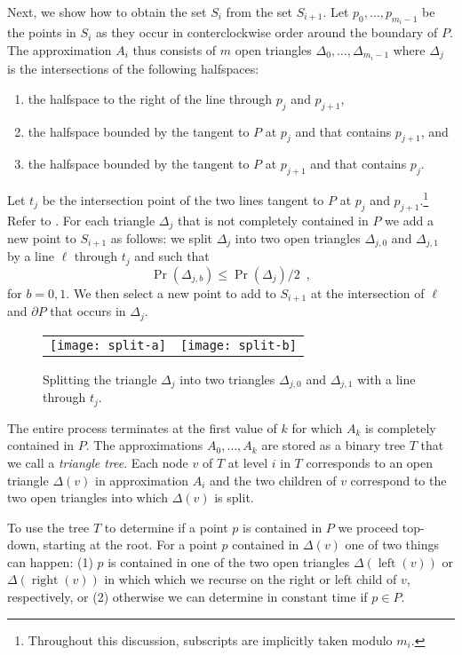 \documentclass[charterfonts,lotsofwhite]{patmorin}
\newcommand{\boundary}{\partial}
\DeclareMathOperator{\lft}{left}
\DeclareMathOperator{\rght}{right}
\begin{document}
Next, we show how to obtain the set $S_i$ from the set $S_{i+1}$.  Let
$p_0,\ldots,p_{m_i-1}$ be the points in $S_i$ as they occur in
conterclockwise order around the boundary of $P$.  The approximation
$A_i$ thus consists of $m$ open triangles
$\Delta_0,\ldots,\Delta_{m_i-1}$ where $\Delta_j$ is the intersections
of the following halfspaces:
\begin{enumerate}
\item the halfspace to the right of the line through $p_j$ and $p_{j+1}$,
\item the halfspace bounded by the tangent to $P$ at $p_j$ and that
contains $p_{j+1}$, and 
\item the halfspace bounded by the tangent to $P$ at $p_{j+1}$ and
that contains $p_j$.
\end{enumerate}
Let $t_j$ be the intersection point of 
the two lines tangent to $P$ at $p_j$ and
$p_{j+1}$.\footnote{Throughout this discussion, subscripts are
implicitly taken modulo $m_i$.}  Refer to . For each
triangle $\Delta_j$ that is not completely contained in $P$
we add a new point to
$S_{i+1}$ as follows:  we split $\Delta_j$ into two open triangles
$\Delta_{j,0}$ and $\Delta_{j,1}$ by a line $\ell$ through $t_j$ and
such that 
\[  
     \Pr(\Delta_{j,b}) \le \Pr(\Delta_{j})/2 \enspace ,
\]
for $b=0,1$.
We then select a new point to add to $S_{i+1}$ at the intersection of
$\ell$ and $\boundary P$ that occurs in $\Delta_j$.

\begin{figure}
\begin{center}
\begin{tabular}{cc}
\texttt{[image: split-a]} & \texttt{[image: split-b]}
\end{tabular}
\end{center}
\caption{Splitting the triangle $\Delta_j$ into two triangles
$\Delta_{j,0}$ and $\Delta_{j,1}$ with a line through $t_j$.}
\end{figure}

The entire process terminates at the first value of $k$ for which
$A_k$ is completely contained in $P$.  The approximations
$A_0,\ldots,A_k$ are stored as a binary tree $T$ that we call a
\emph{triangle tree}.  Each node $v$ of $T$ at level $i$ in $T$
corresponds to an open triangle $\Delta(v)$ in approximation $A_{i}$
and the two children of $v$ correspond to the two open triangles into
which $\Delta(v)$ is split.  

To use the tree $T$ to determine if a point $p$ is contained in $P$ we
proceed top-down, starting at the root.  For a point $p$ contained in
$\Delta(v)$ one of two things can happen: (1) $p$ is contained in one
of the two open triangles $\Delta(\lft(v))$ or $\Delta(\rght(v))$ in
which which we recurse on the right or left child of $v$,
respectively, or (2) otherwise we can determine in constant time if
$p\in P$.
\end{document}
